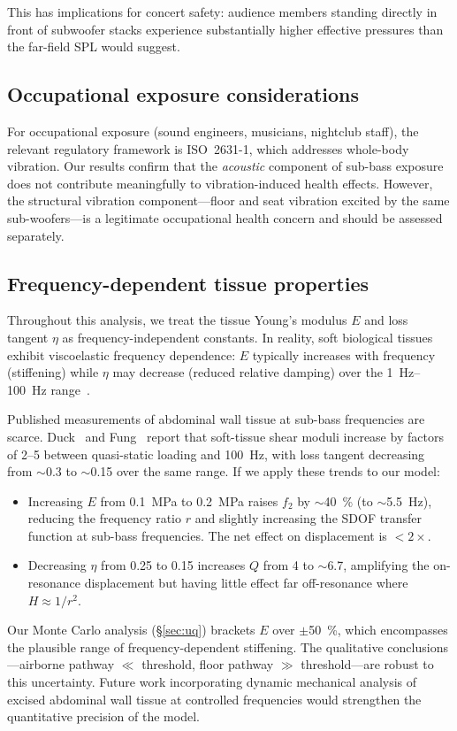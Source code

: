 This has implications for concert safety: audience members standing
directly in front of subwoofer stacks experience substantially higher
effective pressures than the far-field SPL would suggest.

\subsection{Occupational exposure considerations}
\label{sec:occupational}

For occupational exposure (sound engineers, musicians, nightclub staff),
the relevant regulatory framework is ISO~2631-1, which addresses
whole-body vibration.  Our results confirm that the \emph{acoustic}
component of sub-bass exposure does not contribute meaningfully to
vibration-induced health effects.  However, the structural vibration
component---floor and seat vibration excited by the same
sub-woofers---is a legitimate occupational health concern and should be
assessed separately.

\subsection{Frequency-dependent tissue properties}
\label{sec:freq-dependent}

Throughout this analysis, we treat the tissue Young's modulus $E$ and
loss tangent $\eta$ as frequency-independent constants.  In reality,
soft biological tissues exhibit viscoelastic frequency dependence: $E$
typically increases with frequency (stiffening) while $\eta$ may
decrease (reduced relative damping) over the \SIrange{1}{100}{\hertz}
range~\cite{Griffin1990, Mansfield2005}.

Published measurements of abdominal wall tissue at sub-bass frequencies
are scarce.  Duck~\cite{Duck1990} and Fung~\cite{Fung1993} report that soft-tissue shear
moduli increase by factors of 2--5 between quasi-static loading and
\SI{100}{\hertz}, with loss tangent decreasing from $\sim$0.3 to
$\sim$0.15 over the same range.  If we apply these trends to our model:
%
\begin{itemize}
  \item Increasing $E$ from \SI{0.1}{\mega\pascal} to
    \SI{0.2}{\mega\pascal} raises $f_2$ by $\sim$\SI{40}{\percent}
    (to $\sim$\SI{5.5}{\hertz}), reducing the frequency ratio $r$ and
    slightly increasing the SDOF transfer function at sub-bass
    frequencies.  The net effect on displacement is $< 2\times$.

  \item Decreasing $\eta$ from 0.25 to 0.15 increases $Q$ from 4 to
    $\sim$6.7, amplifying the on-resonance displacement but having
    little effect far off-resonance where $H \approx 1/r^2$.
\end{itemize}
%
Our Monte Carlo analysis (\S\ref{sec:uq}) brackets $E$ over
$\pm$\SI{50}{\percent}, which encompasses the plausible range of
frequency-dependent stiffening.  The qualitative conclusions---airborne
pathway $\ll$ threshold, floor pathway $\gg$ threshold---are robust to
this uncertainty.  Future work incorporating dynamic mechanical analysis
of excised abdominal wall tissue at controlled frequencies would
strengthen the quantitative precision of the model.

